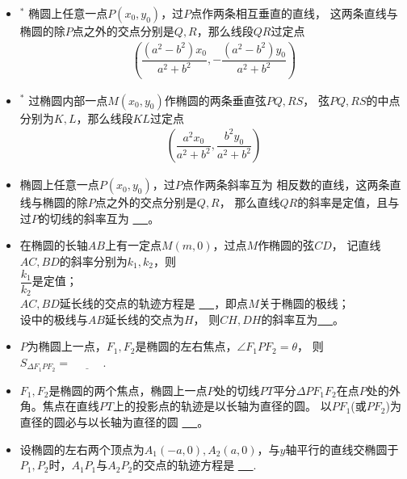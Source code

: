 \documentclass{article}
\newif\ifte
\begin{document}
\begin{multicols}{2}
\begin{enumerate}[leftmargin=20pt]
\begin{itemize}[leftmargin=-4pt]
\item $^*$ 椭圆上任意一点$ P(x_0,y_0) $，过$ P $点作两条相互垂直的直线，
这两条直线与椭圆的除$ P $点之外的交点分别是$ Q,R $，那么线段$ QR $过定点
\begin{gather*}
    \left(\dfrac{(a^2-b^2)x_0}{a^2+b^2},-\dfrac{(a^2-b^2)y_0}{a^2+b^2}\right)
\end{gather*}

\item $^*$ 过椭圆内部一点$ M(x_0,y_0) $作椭圆的两条垂直弦$ PQ,RS $，
弦$ PQ,RS $的中点分别为$ K,L $，那么线段$ KL $过定点
\begin{gather*}
    \left(\dfrac{a^2x_0}{a^2+b^2},\dfrac{b^2y_0}{a^2+b^2}\right)
\end{gather*}

\item 椭圆上任意一点$ P(x_0,y_0) $，过$ P $点作两条斜率互为
相反数的直线，这两条直线与椭圆的除$ P $点之外的交点分别是$ Q,R $，
那么直线$ QR $的斜率是定值，且与过$ P $的切线的斜率互为
\underline{\ \ifte 相反数\else \hspace{2cm} \fi\ }。

\item 在椭圆的长轴$ AB $上有一定点$ M(m,0) $，过点$ M $作椭圆的弦$ CD $，
记直线$ AC,BD $的斜率分别为$ k_{1},k_{2} $，则 \\
 $ \dfrac{k_{1}}{k_{2}} $是定值；\\
  $ AC,BD $延长线的交点的轨迹方程是
\underline{\ \ifte $ x=\dfrac{a^2}{m} $
    \else \hspace{1.5cm} \fi\ }，即点$ M $关于椭圆的极线；\\
 设中的极线与$ AB $延长线的交点为$ H $，
    则$ CH, DH $的斜率互为\underline{\ \ifte 相反数
        \else \hspace{2cm} \fi\ }。

\item $P$为椭圆上一点，$F_1,F_2$是椭圆的左右焦点，$\angle F_1PF_2=\theta $，
则 $ S_{\Delta F_1PF_2}=\underline{\ \ifte b^{2}\tan\dfrac{\theta}{2}
    \else \hspace{1cm} \fi\ } $. 
   
\item $ F_1,F_2 $是椭圆的两个焦点，椭圆上一点$ P $处的切线$ PT $平分$ \Delta
PF_1F_2 $在点$ P $处的外角。焦点在直线$ PT $上的投影点的轨迹是以长轴为直径的圆。
以$ PF_1 $(或$ PF_2 $)为直径的圆必与以长轴为直径的圆
\underline{\ \ifte 内切\else \hspace{1cm} \fi\ }。

\item 设椭圆的左右两个顶点为$ A_1(-a,0),A_2(a,0) $，与$ y $轴平行的直线交椭圆于
$ P_1,P_2 $时，$ A_1P_1 $与$ A_2P_2 $的交点的轨迹方程是
\underline{\ \ifte $ \dfrac{x^2}{a^2}-\dfrac{y^2}{b^2}=1 $
    \else \hspace{2cm} \fi\ }.    


\end{itemize}
\end{enumerate}
\end{multicols}
\end{document}
